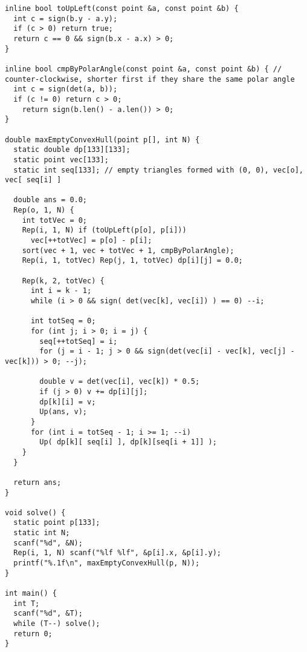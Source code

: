 \begin{lstlisting}
inline bool toUpLeft(const point &a, const point &b) {
  int c = sign(b.y - a.y);
  if (c > 0) return true;
  return c == 0 && sign(b.x - a.x) > 0;
}

inline bool cmpByPolarAngle(const point &a, const point &b) { // counter-clockwise, shorter first if they share the same polar angle
  int c = sign(det(a, b));
  if (c != 0) return c > 0;
    return sign(b.len() - a.len()) > 0;
}

double maxEmptyConvexHull(point p[], int N) {
  static double dp[133][133];
  static point vec[133];
  static int seq[133]; // empty triangles formed with (0, 0), vec[o], vec[ seq[i] ]

  double ans = 0.0;
  Rep(o, 1, N) {
    int totVec = 0;
    Rep(i, 1, N) if (toUpLeft(p[o], p[i])) 
      vec[++totVec] = p[o] - p[i];
    sort(vec + 1, vec + totVec + 1, cmpByPolarAngle);
    Rep(i, 1, totVec) Rep(j, 1, totVec) dp[i][j] = 0.0;
    
    Rep(k, 2, totVec) {
      int i = k - 1;
      while (i > 0 && sign( det(vec[k], vec[i]) ) == 0) --i;
      
      int totSeq = 0;
      for (int j; i > 0; i = j) {
        seq[++totSeq] = i;
        for (j = i - 1; j > 0 && sign(det(vec[i] - vec[k], vec[j] - vec[k])) > 0; --j);

        double v = det(vec[i], vec[k]) * 0.5;
        if (j > 0) v += dp[i][j];
        dp[k][i] = v;
        Up(ans, v);
      }
      for (int i = totSeq - 1; i >= 1; --i)
        Up( dp[k][ seq[i] ], dp[k][seq[i + 1]] );
    }
  }
  
  return ans;
}

void solve() {
  static point p[133];
  static int N;
  scanf("%d", &N);
  Rep(i, 1, N) scanf("%lf %lf", &p[i].x, &p[i].y);
  printf("%.1f\n", maxEmptyConvexHull(p, N));
}

int main() {
  int T;
  scanf("%d", &T);
  while (T--) solve();
  return 0;
}

\end{lstlisting}